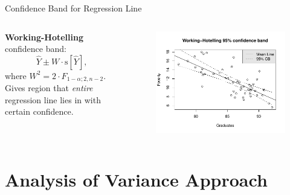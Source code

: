 \documentclass{beamer}
\newcommand{\s}{\mathrm{s}}
\begin{document}
\begin{frame}{Confidence Band for Regression Line}
\begin{columns}
\begin{column}{0.45\textwidth}
\textbf{Working-Hotelling} confidence band:
$$
\hat{Y}\pm W\cdot\s[\hat{Y}],
$$
where $W^2=2\cdot F_{1-\alpha; 2, n-2}$. \pause Gives region that \textit{entire} regression line lies in with certain confidence.
\end{column}%
\begin{column}{.55\textwidth}
\pause \begin{figure}
    \centering
    \includegraphics[width=\textwidth]{plots/conf_band.pdf}
\end{figure}
\end{column}
\end{columns}
\end{frame}

\section{Analysis of Variance Approach}
\end{document}
